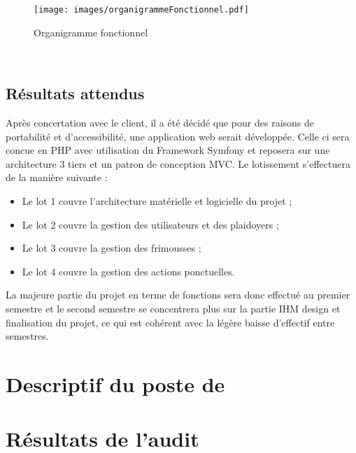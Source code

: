 \documentclass[asi]{picInsa}
\begin{document}
\begin{figure}[H]
	\texttt{[image: images/organigrammeFonctionnel.pdf]}
	\caption{Organigramme fonctionnel}
	\label{organigramme}
\end{figure}
~\\


\section{Résultats attendus}
Après concertation avec le client, il a été décidé que pour des raisons de portabilité et d'accessibilité, une application web serait développée. Celle ci sera concue en PHP avec utilisation du Framework Symfony et reposera sur une architecture 3 tiers et un patron de conception MVC. Le lotissement s’effectuera de la manière suivante :
\begin{itemize}
\item Le lot 1 couvre l'architecture matérielle et logicielle du projet ;
\item Le lot 2 couvre la gestion des utilisateurs et des plaidoyers ;
\item Le lot 3 couvre la gestion des frimousses ;
\item Le lot 4 couvre la gestion des actions ponctuelles.
\end{itemize}

La majeure partie du projet en terme de fonctions sera donc effectué au premier semestre et le second semestre se concentrera plus sur la partie IHM design et finalisation du projet, ce qui est cohérent avec la légère baisse d’effectif entre semestres.

\chapter{Descriptif du poste de \RQ}
\label{Descriptif}

\chapter{Résultats de l'audit}
\label{Resultats}

 
\begin{appendix}
\listoffigures
{}
	 
\listoftables
{}
\end{appendix}
\pageQuatriemeCouverture
\end{document}
